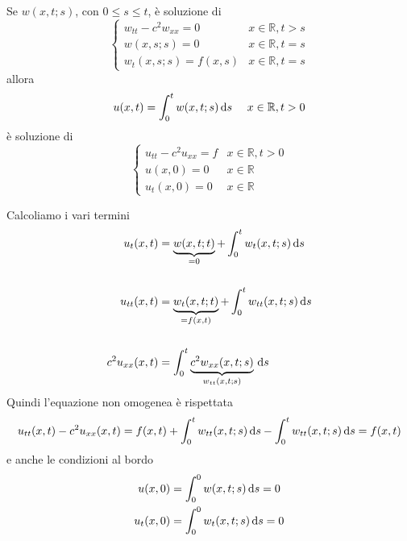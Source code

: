 \begin{theorem}
     Se $\displaystyle w(x,t;s)$, con $\displaystyle 0\leq s\leq t$, è soluzione di
    \begin{equation*}
        \begin{cases}
            w_{tt} -c^{2} w_{xx} =\boxed{0} & x\in \mathbb{R} ,\boxed{t >s} \\
            w(x,s;s) =0                     & x\in \mathbb{R} ,t=s          \\
            w_{t}(x,s;s) =f(x,s)            & x\in \mathbb{R} ,t=s
        \end{cases}
    \end{equation*}
    allora
    \begin{equation*}
        u(x,t) =\int _{0}^{t} w(x,t;s) \,\mathrm d s\ \ \ \ x\in \mathbb{R} ,t >0
    \end{equation*}
    è soluzione di
    \begin{equation*}
        \begin{cases}
            u_{tt} -c^{2} u_{xx} =f & x\in \mathbb{R} ,t >0 \\
            u(x,0) =0               & x\in \mathbb{R}       \\
            u_{t}(x,0) =0           & x\in \mathbb{R}
        \end{cases}
    \end{equation*}
\end{theorem}
\begin{dimostrazione}
    Calcoliamo i vari termini
    \begin{align*}
        u_{t}(x,t)        & =\underbrace{w(x,t;t)}_{=0} +\int _{0}^{t} w_{t}(x,t;s) \,\mathrm d s           \\
                          &                                                                       \\
        u_{tt}(x,t)       & =\underbrace{w_{t}(x,t;t)}_{=f(x,t)} +\int _{0}^{t} w_{tt}(x,t;s) \,\mathrm d s \\
                          &                                                                       \\
        c^{2} u_{xx}(x,t) & =\int _{0}^{t}\underbrace{c^{2} w_{xx}(x,t;s)}_{w_{tt}(x,t;s)} \,\mathrm d s
    \end{align*}
    Quindi l'equazione non omogenea è rispettata
    \begin{equation*}
        u_{tt}(x,t) -c^{2} u_{xx}(x,t) =f(x,t) +\int _{0}^{t} w_{tt}(x,t;s) \,\mathrm d s-\int _{0}^{t} w_{tt}(x,t;s) \,\mathrm d s=f(x,t)
    \end{equation*}
    e anche le condizioni al bordo
    \begin{align*}
        u(x,0)     & =\int _{0}^{0} w(x,t;s) \,\mathrm d s=0     \\
        u_{t}(x,0) & =\int _{0}^{0} w_{t}(x,t;s) \,\mathrm d s=0
    \end{align*}
\end{dimostrazione}

